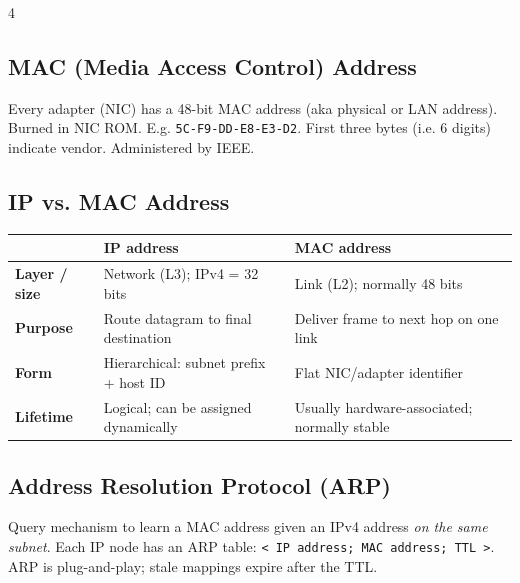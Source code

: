 \documentclass[10pt]{extarticle}
\newenvironment{compactfigure}{\par\begingroup\setlength{\parskip}{0pt}\noindent
\begin{minipage}{\linewidth}\centering}{
\end{minipage}\par\endgroup}
\begin{document}
\begin{multicols}{4}
\begin{compactfigure}
{%
}
\end{compactfigure}

\subsection{MAC (Media Access Control) Address}
Every adapter (NIC) has a 48-bit MAC address (aka physical or LAN address). Burned in NIC ROM. E.g. \texttt{5C-F9-DD-E8-E3-D2}. First three bytes (i.e. 6 digits) indicate vendor. Administered by IEEE.

\subsection{IP vs. MAC Address}
\begingroup
\renewcommand{\arraystretch}{1.05}
\begin{tabular}{@{}p{1cm}p{2.5cm}p{2.5cm}@{}}
\toprule
& \textbf{IP address} & \textbf{MAC address} \\
\midrule
\textbf{Layer / size} & Network (L3); IPv4 = 32 bits & Link (L2); normally 48 bits \\
\textbf{Purpose} & Route datagram to final destination & Deliver frame to next hop on one link \\
\textbf{Form} & Hierarchical: subnet prefix + host ID & Flat NIC/adapter identifier \\
\textbf{Lifetime} & Logical; can be assigned dynamically & Usually hardware-associated; normally stable \\
\bottomrule
\end{tabular}
\endgroup

\subsection{Address Resolution Protocol (ARP)}
Query mechanism to learn a MAC address given an IPv4 address \emph{on the
same subnet}. Each IP node has an ARP table:
\texttt{< IP address; MAC address; TTL >}. ARP is plug-and-play; stale
mappings expire after the TTL.


\end{multicols}
\end{document}
